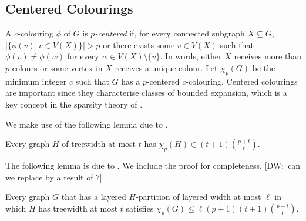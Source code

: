 \documentclass{patmorin}
\newcommand{\note}[2]{{\color{red}[#1:~#2]}}
\renewcommand{\le}{\leqslant}
\begin{document}
\subsection{Centered Colourings}

A $c$-colouring $\phi$ of $G$ is \emph{$p$-centered} if, for every connected subgraph $X\subseteq G$, $|\{\phi(v):v\in V(X)\}| > p$ or there exists some $v\in V(X)$ such that $\phi(v)\neq \phi(w)$ for every $w\in V(X)\setminus\{v\}$.  In words, either $X$ receives more than $p$ colours or some vertex in $X$ receives a unique colour.  Let $\chi_p(G)$ be the minimum integer $c$ such that $G$ has a $p$-centered $c$-colouring. 
Centered colourings are important since they characterise classes of bounded expansion, which is a key concept in the sparsity theory of \citet{Sparsity}. 

We make use of the following lemma due to \citet{pilipczuk.siebertz:polynomial-soda}.

\begin{lem}
\label{p-centered-treewidth}
Every graph $H$ of treewidth at most $t$ has $\chi_p(H)\in (t+1)\binom{p+t}{t}$.
\end{lem}

The following lemma is due to \citet{micek:personal}. We include the proof  for completeness. \note{DW}{can we replace by a result of \citet{micek:personal}?}

\begin{lem}
\label{p-centered}
Every graph $G$ that has a layered $H$-partition of layered width at most $\ell$ in which $H$ has treewidth at most $t$ satisfies $\chi_p(G)\le \ell (p+1) (t+1)\binom{p+t}{t}$. 
\end{lem}
\end{document}
